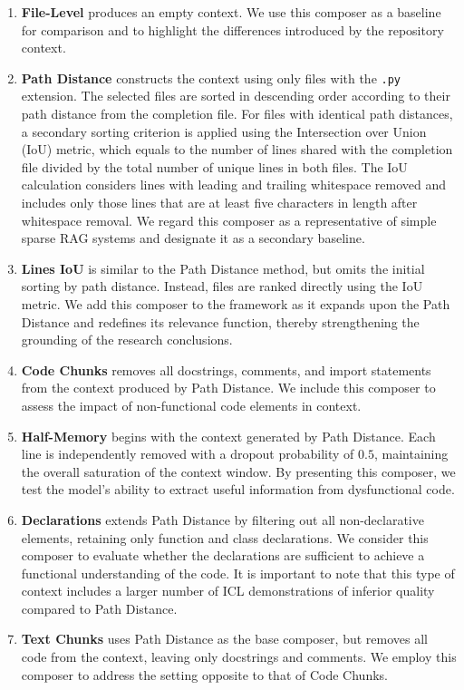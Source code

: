 \begin{enumerate}
    \item \textbf{File-Level} produces an empty context. We use this composer as a baseline for comparison and to highlight the differences introduced by the repository context.
    \item \textbf{Path Distance} constructs the context using only files with the \texttt{.py} extension. The selected files are sorted in descending order according to their path distance from the completion file. For files with identical path distances, a secondary sorting criterion is applied using the Intersection over Union (IoU) metric, which equals to the number of lines shared with the completion file divided by the total number of unique lines in both files. The IoU calculation considers lines with leading and trailing whitespace removed and includes only those lines that are at least five characters in length after whitespace removal. We regard this composer as a representative of simple sparse RAG systems and designate it as a secondary baseline.
    \item \textbf{Lines IoU} is similar to the Path Distance method, but omits the initial sorting by path distance. Instead, files are ranked directly using the IoU metric. We add this composer to the framework as it expands upon the Path Distance and redefines its relevance function, thereby strengthening the grounding of the research conclusions.
    \item \textbf{Code Chunks} removes all docstrings, comments, and import statements from the context produced by Path Distance. We include this composer to assess the impact of non-functional code elements in context.
    \item \textbf{Half-Memory} begins with the context generated by Path Distance. Each line is independently removed with a dropout probability of \(0.5\), maintaining the overall saturation of the context window. By presenting this composer, we test the model's ability to extract useful information from dysfunctional code.
    \item \textbf{Declarations} extends Path Distance by filtering out all non-declarative elements, retaining only function and class declarations. We consider this composer to evaluate whether the declarations are sufficient to achieve a functional understanding of the code. It is important to note that this type of context includes a larger number of ICL demonstrations of inferior quality compared to Path Distance.
    \item \textbf{Text Chunks} uses Path Distance as the base composer, but removes all code from the context, leaving only docstrings and comments. We employ this composer to address the setting opposite to that of Code Chunks.

\end{enumerate}

